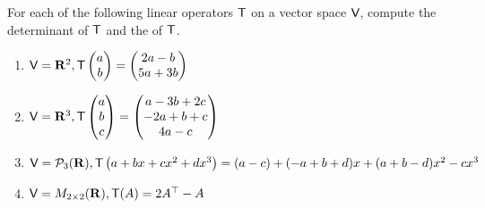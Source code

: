 \begin{exercise} \label{exercise 5.1.2}
For each of the following linear operators \(\textsf{T}\) on a vector space \(\textsf{V}\), compute the determinant of \(\textsf{T}\) and the \CPOLY{} of \(\textsf{T}\).
\begin{enumerate}
\item \(\textsf{V} = \mathbf{R}^2, \textsf{T}\begin{pmatrix}a \\ b\end{pmatrix}=\begin{pmatrix}2 a-b \\ 5 a+3 b\end{pmatrix}\)
\item \(\textsf{V} = \mathbf{R}^{3}, \textsf{T}\begin{pmatrix}a \\ b \\ c\end{pmatrix}=\begin{pmatrix}a-3 b+2 c \\ -2 a+b+c \\ 4 a-c\end{pmatrix}\)
\item \(\textsf{V} = \mathcal{P}_{3}(\mathbf{R}), \textsf{T}\left(a+b x+c x^{2}+d x^{3}\right)=(a-c)+(-a+b+d) x+(a+b-d) x^{2}-c x^{3}\)
\item \(\textsf{V} = M_{2 \times 2}(\mathbf{R}), \textsf{T}(A) = 2 A^\top - A\)
\end{enumerate}
\end{exercise}


